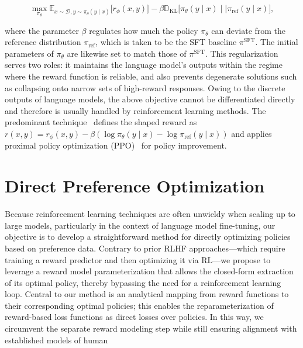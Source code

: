 \begin{equation}\label{eq:RL}
\max_{\pi_{\theta}}  \mathbb{E}_{x\sim \mathcal{D}, y\sim \pi_{\theta}(y \mid x)}\bigl[r_{\phi}(x, y)\bigr] - \beta\mathbb{D}_{\textrm{KL}}\bigl[\pi_{\theta}(y\mid x)\mid \mid \pi_\text{ref}(y\mid x)\bigr],
\end{equation}

where the parameter $\beta$ regulates how much the policy $\pi_\theta$ can deviate from the reference distribution $\pi_\text{ref}$, which is taken to be the SFT baseline $\pi^\text{SFT}$. The initial parameters of $\pi_\theta$ are likewise set to match those of $\pi^\text{SFT}$. This regularization serves two roles: it maintains the language model's outputs within the regime where the reward function is reliable, and also prevents degenerate solutions such as collapsing onto narrow sets of high-reward responses. Owing to the discrete outputs of language models, the above objective cannot be differentiated directly and therefore is usually handled by reinforcement learning methods. The predominant technique~\cite{ziegler2020finetuning, stiennon2022learning, bai2022training, ouyang2022training} defines the shaped reward as ${r(x, y) = r_{\phi}(x, y) -\beta (\log \pi_{\theta}(y\mid x) - \log \pi_\text{ref}(y\mid x))}$ and applies proximal policy optimization (PPO)~\cite{schulman2017proximal} for policy improvement.

\section{Direct Preference Optimization}\label{sec:DPO}

Because reinforcement learning techniques are often unwieldy when scaling up to large models, particularly in the context of language model fine-tuning, our objective is to develop a straightforward method for directly optimizing policies based on preference data. Contrary to prior RLHF approaches—which require training a reward predictor and then optimizing it via RL—we propose to leverage a reward model parameterization that allows the closed-form extraction of its optimal policy, thereby bypassing the need for a reinforcement learning loop. Central to our method is an analytical mapping from reward functions to their corresponding optimal policies; this enables the reparameterization of reward-based loss functions as direct losses over policies. In this way, we circumvent the separate reward modeling step while still ensuring alignment with established models of human

